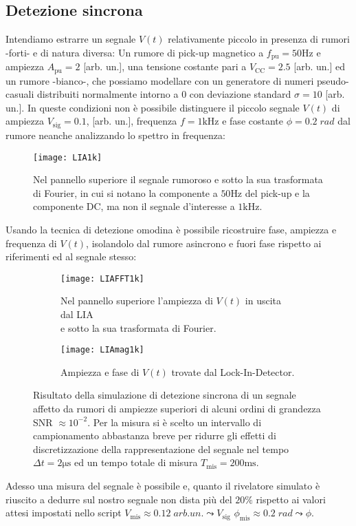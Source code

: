 \documentclass{article}[a4paper, oneside, 11pt]
\begin{document}
\subsection{Detezione sincrona}
Intendiamo estrarre un segnale $V(t)$ relativamente piccolo
in presenza di rumori -forti- e di natura diversa:
Un rumore di pick-up magnetico a $f_{\text{pu}} = 50 \si{\Hz}$ e ampiezza
$A_{\text{pu}} = 2$ [arb. un.], una tensione costante pari a 
$V_{\text{CC}} = 2.5$ [arb. un.] ed un rumore -bianco-, che possiamo modellare
con un generatore di numeri pseudo-casuali distribuiti normalmente
intorno a 0 con deviazione standard $\sigma = 10$ [arb. un.].
In queste condizioni non è possibile distinguere il piccolo segnale $V(t)$ 
di ampiezza $V_{\text{sig}} = 0.1$, [arb. un.], frequenza 
$f = 1 \si{\kilo\hertz}$ e fase costante $\phi = 0.2 \; \si{rad}$
dal rumore neanche analizzando lo spettro in frequenza:
\begin{figure}[!htb]
\centering
	\texttt{[image: LIA1k]}
	\caption{Nel pannello superiore il segnale rumoroso e sotto la sua
			trasformata di Fourier, in cui si notano la componente a
			$50 \si{\Hz}$ del pick-up e la componente DC, ma non il segnale
			d'interesse a $1 \si{\kilo\hertz}$. \label{fig: LIAnoise}}
\end{figure}
Usando la tecnica di detezione omodina è possibile ricostruire fase,
ampiezza e frequenza di $V(t)$, isolandolo dal rumore asincrono e fuori
fase rispetto ai riferimenti ed al segnale stesso:
\begin{figure}[!htb]
	\centering
	\begin{subfigure}{.5\textwidth}
		\texttt{[image: LIAFFT1k]}
		\caption{Nel pannello superiore l'ampiezza di $V(t)$ in uscita dal LIA \\
				\; e sotto la sua trasformata di Fourier.}
	\end{subfigure}%
	\begin{subfigure}{.5\textwidth}
		\texttt{[image: LIAmag1k]}
		\caption{Ampiezza e fase di $V(t)$ trovate dal Lock-In-Detector.}
	\end{subfigure}
	\caption{Risultato della simulazione di detezione sincrona di un segnale
			affetto da rumori di ampiezze superiori di alcuni ordini di
			grandezza SNR $\approx 10^{-2}$. Per la misura si è scelto un
			intervallo di campionamento abbastanza breve per ridurre
			gli effetti di discretizzazione della rappresentazione
			del segnale nel tempo $\Delta t = 2 \si{\us}$
			ed un tempo totale di misura $T_{\text{mis}} = 200 \si{\ms}$.
		\label{fig: LIAall}}
\end{figure}
Adesso una misura del segnale è possibile e, quanto il rivelatore simulato è
riuscito a dedurre sul nostro segnale non dista più del $20 \%$ rispetto ai
valori attesi impostati nello script $V_{\text{mis}} \approx 0.12 \;
\si{arb. un.} \leadsto V_{\text{sig}}$ $\phi_{\text{mis}} \approx 0.2 \;
\si{rad} \leadsto \phi$.
\end{document}

